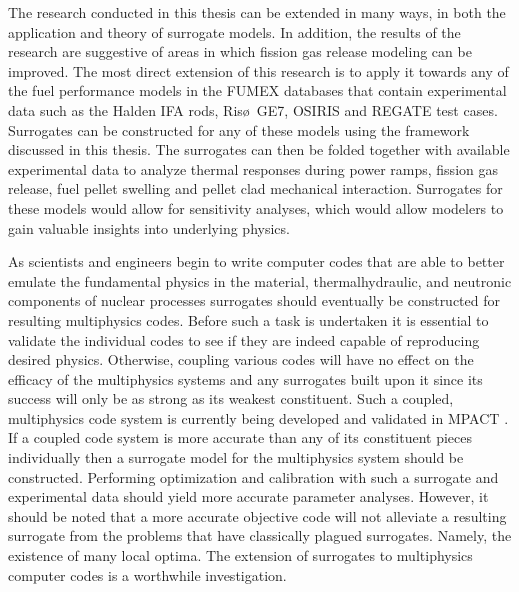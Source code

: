 The research conducted in this thesis can be extended in many ways, in both the application and theory of surrogate models. In addition, the results of the research are suggestive of areas in which fission gas release modeling can be improved. The most direct extension of this research is to apply it towards any of the fuel performance models in the FUMEX databases \cite{fumex2} \cite{fumex3} that contain experimental data such as the Halden IFA  rods, Ris\o~GE7, OSIRIS and REGATE test cases. Surrogates can be constructed for any of these models using the framework discussed in this thesis. The surrogates can then be folded together with available experimental data to analyze thermal responses during power ramps, fission gas release, fuel pellet swelling and pellet clad mechanical interaction. Surrogates for these models would allow for sensitivity analyses, which would allow modelers to gain valuable insights into underlying physics. 

As scientists and engineers begin to write computer codes that are able to better emulate the fundamental physics in the material, thermalhydraulic, and neutronic components of nuclear processes surrogates should eventually be constructed for resulting multiphysics codes. Before such a task is undertaken it is essential to validate the individual codes to see if they are indeed capable of reproducing desired physics. Otherwise, coupling various codes  will have no effect on the efficacy of the multiphysics systems and any surrogates built upon it since its success will only be as strong as its weakest constituent. Such a coupled, multiphysics code system is currently being developed and validated in \ac{MPACT} \cite{Kochunas}. If a coupled code system is more accurate than any of its constituent pieces individually then a surrogate model for the multiphysics system should be constructed. Performing optimization and calibration with such a surrogate and experimental data should yield more accurate parameter analyses. However, it should be noted that a more accurate objective code will not alleviate a resulting surrogate from the problems that have classically plagued surrogates. Namely, the existence of many local optima. The extension of surrogates to multiphysics computer codes is a worthwhile investigation.  

